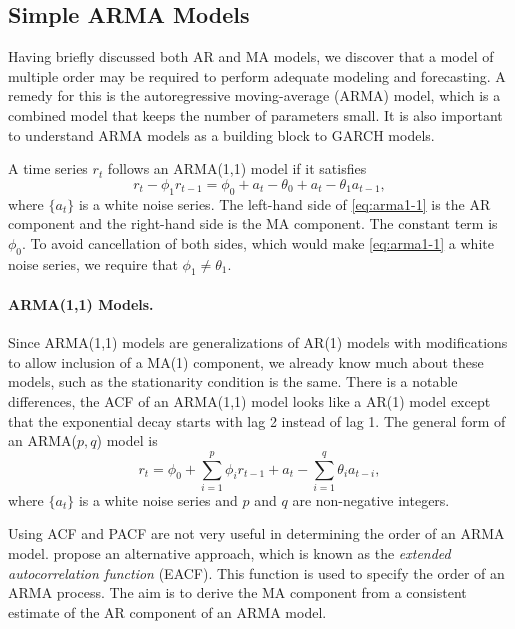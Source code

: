 \subsection{Simple ARMA Models}
Having briefly discussed both AR and MA models, we discover that a model of multiple order may be required to perform adequate modeling and forecasting.
A remedy for this is the autoregressive moving-average (ARMA) model, which is a combined model that keeps the number of parameters small. It is also important to understand ARMA models as a building block to GARCH models.

A time series $r_t$ follows an ARMA(1,1) model if it satisfies
\begin{equation}
r_t - \phi_1 r_{t-1} = \phi_0 + a_t - \theta_0 + a_t - \theta_1 a_{t-1},
\label{eq:arma1-1}
\end{equation}
where $\{a_t\}$ is a white noise series. The left-hand side of \eqref{eq:arma1-1} is the AR component and the right-hand side is the MA component. The constant term is $\phi_0$. To avoid cancellation of both sides, which would make \eqref{eq:arma1-1} a white noise series, we require that $\phi_1 \ne \theta_1$.

\paragraph{ARMA(1,1) Models.} Since ARMA(1,1) models are generalizations of AR(1) models with modifications to allow inclusion of a MA(1) component, we already know much about these models, such as the stationarity condition is the same. There is a notable differences, the ACF of an ARMA(1,1) model looks like a AR(1) model except that the exponential decay starts with lag 2 instead of lag 1. The general form of an ARMA($p,q$) model is
\[
r_t = \phi_0 + \sum^p_{i=1} \phi_i r_{t-1} + a_t - \sum^q_{i=1} \theta_i a_{t-i},
\]
where $\{a_t\}$ is a white noise series and $p$ and $q$ are non-negative integers.

Using ACF and PACF are not very useful in determining the order of an ARMA model.  propose an alternative approach, which is known as the \emph{extended autocorrelation function} (EACF). This function is used to specify the order of an ARMA process. The aim is to derive the MA component from a consistent estimate of the AR component of an ARMA model.

